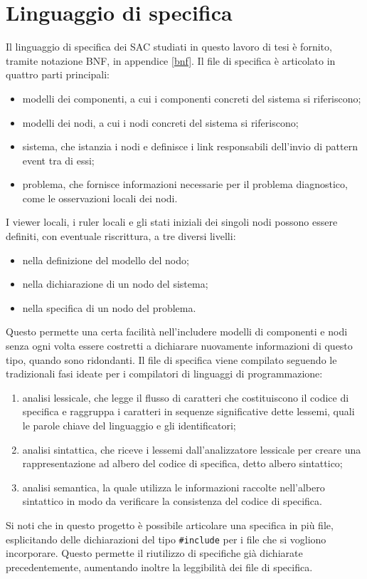 \section{Linguaggio di specifica}
Il linguaggio di specifica dei SAC studiati in questo lavoro di tesi è fornito, tramite notazione BNF, in appendice \ref{bnf}. 
Il file di specifica è articolato in quattro parti principali:
\begin{itemize}
\item modelli dei componenti, a cui i componenti concreti del sistema si riferiscono;
\item modelli dei nodi, a cui i nodi concreti del sistema si riferiscono;
\item sistema, che istanzia i nodi e definisce i link responsabili dell'invio di pattern event tra di essi;
\item problema, che fornisce informazioni necessarie per il problema diagnostico, come le osservazioni locali dei nodi.
\end{itemize}
I viewer locali, i ruler locali e gli stati iniziali dei singoli nodi possono essere definiti, con eventuale riscrittura, a tre diversi livelli:
\begin{itemize}
\item nella definizione del modello del nodo;
\item nella dichiarazione di un nodo del sistema;
\item nella specifica di un nodo del problema.
\end{itemize}
Questo permette una certa facilità nell'includere modelli di componenti e nodi senza ogni volta essere costretti a dichiarare nuovamente informazioni di questo tipo, quando sono ridondanti.
Il file di specifica viene compilato seguendo le tradizionali fasi ideate per i compilatori di linguaggi di programmazione:
\begin{enumerate}
\item analisi lessicale, che legge il flusso di caratteri che costituiscono il codice di specifica e raggruppa i caratteri in sequenze significative dette lessemi, quali le parole chiave del linguaggio e gli identificatori;
\item analisi sintattica, che riceve i lessemi dall'analizzatore lessicale per creare una rappresentazione ad albero del codice di specifica, detto albero sintattico;
\item analisi semantica, la quale utilizza le informazioni raccolte nell'albero sintattico in modo da verificare la consistenza del codice di specifica.
\end{enumerate}
Si noti che in questo progetto è possibile articolare una specifica in più file, esplicitando delle dichiarazioni del tipo \verb|#include| per i file che si vogliono incorporare. 
Questo permette il riutilizzo di specifiche già dichiarate precedentemente, aumentando inoltre la leggibilità dei file di specifica.


